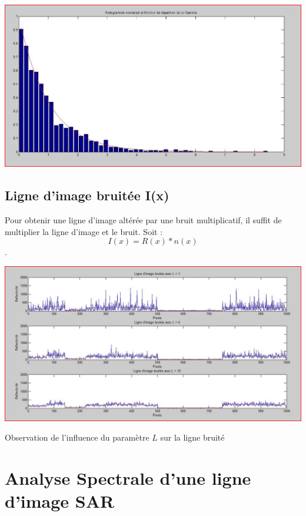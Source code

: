 \documentclass[a4paper,11pt]{article}
\newcommand{\FSource}[1]{%
  
  }
\begin{document}
\FSource{matlab/2.m}

\vspace{0.5cm}

\includegraphics[width=15cm]{capture/bruit.JPG}

\subsection{Ligne d'image bruitée I(x)}

Pour obtenir une ligne d'image altérée par une bruit multiplicatif, il suffit de multiplier la ligne d'image et le bruit. Soit :
$$I(x) = R(x) * n(x)$$.

\includegraphics[width=15cm]{capture/ligne.JPG}
\begin{center}Observation de l'influence du paramètre $L$ sur la ligne
bruité\end{center}

\newpage

\section{Analyse Spectrale d'une ligne d'image SAR}
\end{document}
